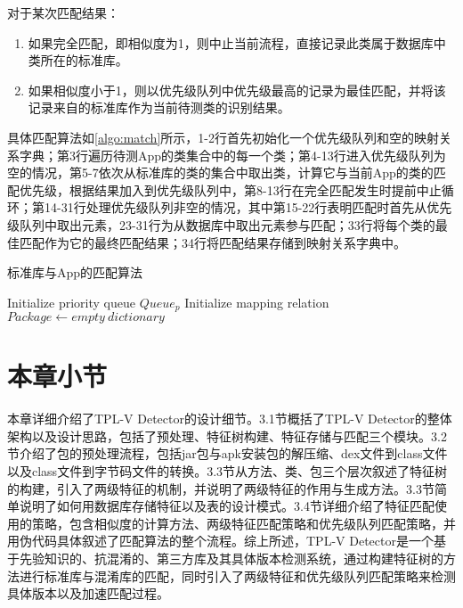 对于某次匹配结果：
\begin{enumerate}
\item{如果完全匹配，即相似度为1，则中止当前流程，直接记录此类属于数据库中类所在的标准库。}
\item{如果相似度小于1，则以优先级队列中优先级最高的记录为最佳匹配，并将该记录来自的标准库作为当前待测类的识别结果。}
\end{enumerate}


具体匹配算法如\ref{algo:match}所示，1-2行首先初始化一个优先级队列和空的映射关系字典；第3行遍历待测App的类集合中的每一个类；第4-13行进入优先级队列为空的情况，第5-7依次从标准库的类的集合中取出类，计算它与当前App的类的匹配优先级，根据结果加入到优先级队列中，第8-13行在完全匹配发生时提前中止循环；第14-31行处理优先级队列非空的情况，其中第15-22行表明匹配时首先从优先级队列中取出元素，23-31行为从数据库中取出元素参与匹配；33行将每个类的最佳匹配作为它的最终匹配结果；34行将匹配结果存储到映射关系字典中。


\begin{algorithm}[htb]
  \caption{标准库与App的匹配算法}
  \label{algo:match}
  \small
  \SetAlgoLined

  Initialize priority queue $Queue_{p}$\;
  Initialize mapping relation $Package\leftarrow empty\ dictionary$\;
\end{algorithm}


\section{本章小节}
本章详细介绍了TPL-V Detector的设计细节。3.1节概括了TPL-V Detector的整体架构以及设计思路，包括了预处理、特征树构建、特征存储与匹配三个模块。3.2节介绍了包的预处理流程，包括jar包与apk安装包的解压缩、dex文件到class文件以及class文件到字节码文件的转换。3.3节从方法、类、包三个层次叙述了特征树的构建，引入了两级特征的机制，并说明了两级特征的作用与生成方法。3.3节简单说明了如何用数据库存储特征以及表的设计模式。3.4节详细介绍了特征匹配使用的策略，包含相似度的计算方法、两级特征匹配策略和优先级队列匹配策略，并用伪代码具体叙述了匹配算法的整个流程。综上所述，TPL-V Detector是一个基于先验知识的、抗混淆的、第三方库及其具体版本检测系统，通过构建特征树的方法进行标准库与混淆库的匹配，同时引入了两级特征和优先级队列匹配策略来检测具体版本以及加速匹配过程。


